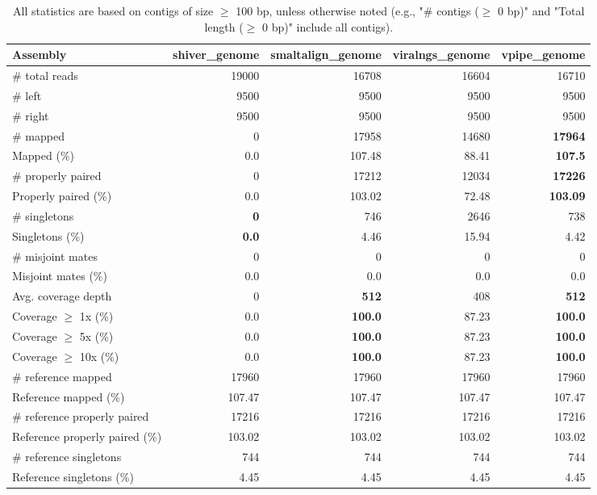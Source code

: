 \documentclass[12pt,a4paper]{article}
\begin{document}
\begin{table}[ht]
\begin{center}
\caption{All statistics are based on contigs of size $\geq$ 100 bp, unless otherwise noted (e.g., "\# contigs ($\geq$ 0 bp)" and "Total length ($\geq$ 0 bp)" include all contigs).}
\begin{tabular}{|l*{4}{|r}|}
\hline
Assembly & shiver\_genome & smaltalign\_genome & viralngs\_genome & vpipe\_genome \\ \hline
\# total reads & 19000 & 16708 & 16604 & 16710 \\ \hline
\# left & 9500 & 9500 & 9500 & 9500 \\ \hline
\# right & 9500 & 9500 & 9500 & 9500 \\ \hline
\# mapped & 0 & 17958 & 14680 & {\bf 17964} \\ \hline
Mapped (\%) & 0.0 & 107.48 & 88.41 & {\bf 107.5} \\ \hline
\# properly paired & 0 & 17212 & 12034 & {\bf 17226} \\ \hline
Properly paired (\%) & 0.0 & 103.02 & 72.48 & {\bf 103.09} \\ \hline
\# singletons & {\bf 0} & 746 & 2646 & 738 \\ \hline
Singletons (\%) & {\bf 0.0} & 4.46 & 15.94 & 4.42 \\ \hline
\# misjoint mates & 0 & 0 & 0 & 0 \\ \hline
Misjoint mates (\%) & 0.0 & 0.0 & 0.0 & 0.0 \\ \hline
Avg. coverage depth & 0 & {\bf 512} & 408 & {\bf 512} \\ \hline
Coverage $\geq$ 1x (\%) & 0.0 & {\bf 100.0} & 87.23 & {\bf 100.0} \\ \hline
Coverage $\geq$ 5x (\%) & 0.0 & {\bf 100.0} & 87.23 & {\bf 100.0} \\ \hline
Coverage $\geq$ 10x (\%) & 0.0 & {\bf 100.0} & 87.23 & {\bf 100.0} \\ \hline
\# reference mapped & 17960 & 17960 & 17960 & 17960 \\ \hline
Reference mapped (\%) & 107.47 & 107.47 & 107.47 & 107.47 \\ \hline
\# reference properly paired & 17216 & 17216 & 17216 & 17216 \\ \hline
Reference properly paired (\%) & 103.02 & 103.02 & 103.02 & 103.02 \\ \hline
\# reference singletons & 744 & 744 & 744 & 744 \\ \hline
Reference singletons (\%) & 4.45 & 4.45 & 4.45 & 4.45 \\ \hline

\end{tabular}
\end{center}
\end{table}
\end{document}
